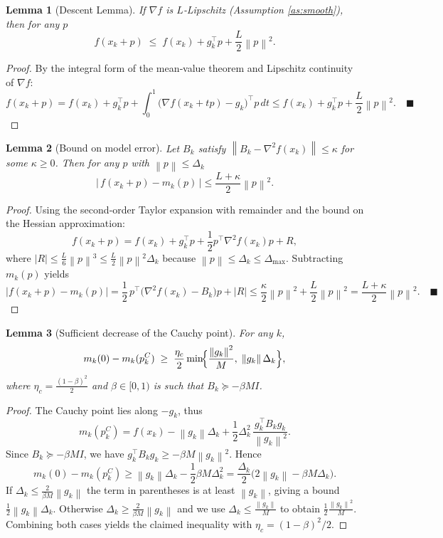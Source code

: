 \documentclass{article}
\newtheorem{lemma}{Lemma}
\newcommand{\norm}[1]{\left\lVert#1\right\rVert}
\begin{document}
\begin{lemma}[Descent Lemma]\label{lem:descent}
If $\nabla f$ is $L$‑Lipschitz (Assumption \ref{as:smooth}), then for any $p$
\[
f(x_{k}+p)\;\le\; f(x_{k})+g_{k}^{\top}p+\frac{L}{2}\norm{p}^{2}.
\tag{L1}
\]
\end{lemma}
\begin{proof}
By the integral form of the mean‑value theorem and Lipschitz continuity of $\nabla f$:
\[
f(x_{k}+p)=f(x_{k})+g_{k}^{\top}p+\int_{0}^{1}\!\!\bigl(\nabla f(x_{k}+tp)-g_{k}\bigr)^{\!\top}\!p\,dt
\le f(x_{k})+g_{k}^{\top}p+\frac{L}{2}\norm{p}^{2}.
\quad\blacksquare
\]
\end{proof}

\begin{lemma}[Bound on model error]\label{lem:model_error}
Let $B_{k}$ satisfy $\norm{B_{k}-\nabla^{2}f(x_{k})}\le \kappa$ for some $\kappa\ge0$. Then for any $p$ with $\norm{p}\le\Delta_{k}$
\[
\bigl|\,f(x_{k}+p)-m_{k}(p)\,\bigr|
\le \frac{L+\kappa}{2}\norm{p}^{2}.
\tag{L2}
\]
\end{lemma}
\begin{proof}
Using the second‑order Taylor expansion with remainder and the bound on the Hessian approximation:
\[
f(x_{k}+p)=f(x_{k})+g_{k}^{\top}p+\frac12p^{\top}\nabla^{2}f(x_{k})p+R,
\]
where $|R|\le\frac{L}{6}\norm{p}^{3}\le\frac{L}{2}\norm{p}^{2}\Delta_{k}$ because $\norm{p}\le\Delta_{k}\le\Delta_{\max}$.
Subtracting $m_{k}(p)$ yields
\[
|f(x_{k}+p)-m_{k}(p)|
= \frac12\,p^{\top}\bigl(\nabla^{2}f(x_{k})-B_{k}\bigr)p+|R|
\le\frac{\kappa}{2}\norm{p}^{2}+\frac{L}{2}\norm{p}^{2}
=\frac{L+\kappa}{2}\norm{p}^{2}. \quad\blacksquare
\]
\end{proof}

\begin{lemma}[Sufficient decrease of the Cauchy point]\label{lem:cauchy_decrease}
For any $k$,
\[
m_{k}(0)-m_{k}(p_{k}^{C})\;\ge\;
\frac{\eta_{c}}{2}\min\!\Bigl\{ \frac{\norm{g_{k}}^{2}}{M},\; \norm{g_{k}}\Delta_{k}\Bigr\},
\]
where $\eta_{c}= \frac{(1-\beta)^{2}}{2}$ and $\beta\in[0,1)$ is such that $B_{k}\succeq -\beta M I$.
\end{lemma}
\begin{proof}
The Cauchy point lies along $-g_{k}$, thus
\[
m_{k}(p_{k}^{C})=f(x_{k})-\norm{g_{k}}\Delta_{k}+\frac12\Delta_{k}^{2}\, \frac{g_{k}^{\top}B_{k}g_{k}}{\norm{g_{k}}^{2}}.
\]
Since $B_{k}\succeq -\beta M I$, we have $g_{k}^{\top}B_{k}g_{k}\ge -\beta M\norm{g_{k}}^{2}$. Hence
\[
m_{k}(0)-m_{k}(p_{k}^{C})
\ge \norm{g_{k}}\Delta_{k}-\frac12\beta M\Delta_{k}^{2}
= \frac{\Delta_{k}}{2}\bigl(2\norm{g_{k}}-\beta M\Delta_{k}\bigr).
\]
If $\Delta_{k}\le \frac{2}{\beta M}\norm{g_{k}}$ the term in parentheses is at least $\norm{g_{k}}$, giving a bound $\frac12\norm{g_{k}}\Delta_{k}$. Otherwise $\Delta_{k}\ge \frac{2}{\beta M}\norm{g_{k}}$ and we use $\Delta_{k}\le\frac{\norm{g_{k}}}{M}$ to obtain $\frac12\frac{\norm{g_{k}}^{2}}{M}$. Combining both cases yields the claimed inequality with $\eta_{c}=(1-\beta)^{2}/2$. \quad\blacksquare
\end{proof}
\end{document}
